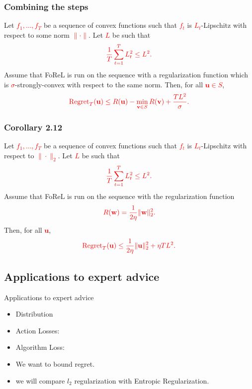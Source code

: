 \documentclass[handout]{beamer}
\begin{document}
\begin{frame}
    \frametitle{Combining the steps}
    Let 
    \textcolor{red}{$f_1, \dots, f_T$} 
    be a sequence of convex functions such that 
    \textcolor{red}{$f_t$} 
    is 
    \textcolor{red}{$L_t$}-Lipschitz 
    with respect to some norm \textcolor{red}{$\|\cdot\|$}. Let 
    \textcolor{red}{$L$} 
    be such that 
    \[
    \textcolor{red}{\frac{1}{T} \sum_{t=1}^{T} L_t^2 \leq L^2.}
    \]
    Assume that FoReL is run on the sequence with a regularization function which is 
    \textcolor{red}{$\sigma$}-strongly-convex 
    with respect to the same norm. Then, for all 
    \textcolor{red}{$\mathbf{u} \in S$},
    \[
    \textcolor{red}{\operatorname{Regret}_T(\mathbf{u}) \leq R(\mathbf{u}) - \min_{\mathbf{v} \in S} R(\mathbf{v}) + \frac{T L^2}{\sigma}.}
    \]
\end{frame}

\begin{frame}
    \frametitle{Corollary 2.12}
    Let 
    \textcolor{red}{$f_1, \dots, f_T$} 
    be a sequence of convex functions such that 
    \textcolor{red}{$f_t$} 
    is 
    \textcolor{red}{$L_t$}-Lipschitz 
    with respect to \textcolor{red}{$\|\cdot\|_2$}. Let 
    \textcolor{red}{$L$} 
    be such that 
    \[
    \textcolor{red}{\frac{1}{T} \sum_{t=1}^{T} L_t^2 \leq L^2.}
    \]
    Assume that FoReL is run on the sequence with the regularization function 
    \[
    \textcolor{red}{R(\mathbf{w}) = \frac{1}{2\eta} \|\mathbf{w}\|_2^2.}
    \]
    Then, for all \textcolor{red}{$\mathbf{u}$},
    \[
    \textcolor{red}{\operatorname{Regret}_T(\mathbf{u}) \leq \frac{1}{2\eta} \|\mathbf{u}\|_2^2 + \eta T L^2.}
    \]
\end{frame}

\subsection{Applications to expert advice}

\begin{frame}{Applications to expert advice}
  \begin{itemize}
    \item Distribution 
    \item Action Losses: 
    \item Algorithm Loss: 
    \item We want to bound regret.
    \item we will compare $l_2$ regularization with Entropic
      Regularization.
  \end{itemize}
\end{frame}
\end{document}
